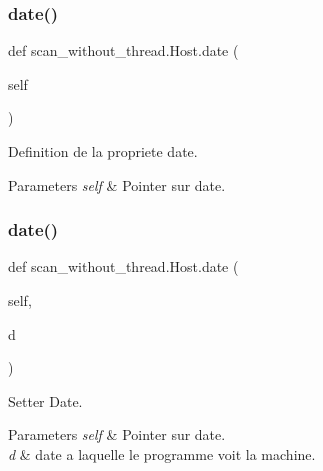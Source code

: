 \subsubsection{\texorpdfstring{date()}{date()}\hspace{0.1cm}{\footnotesize\ttfamily [1/2]}}
{\footnotesize\ttfamily def scan\+\_\+without\+\_\+thread.\+Host.\+date (\begin{DoxyParamCaption}\item[{}]{self }\end{DoxyParamCaption})}



Definition de la propriete date. 


\begin{DoxyParams}{Parameters}
{\em self} & Pointer sur date. \\
\hline
\end{DoxyParams}
\hypertarget{classscan__without__thread_1_1Host_a82dddd1ba57f1f790b16c1618753f59e}{}\label{classscan__without__thread_1_1Host_a82dddd1ba57f1f790b16c1618753f59e} 
\subsubsection{\texorpdfstring{date()}{date()}\hspace{0.1cm}{\footnotesize\ttfamily [2/2]}}
{\footnotesize\ttfamily def scan\+\_\+without\+\_\+thread.\+Host.\+date (\begin{DoxyParamCaption}\item[{}]{self,  }\item[{}]{d }\end{DoxyParamCaption})}



Setter Date. 


\begin{DoxyParams}{Parameters}
{\em self} & Pointer sur date. \\
\hline
{\em d} & date a laquelle le programme voit la machine. \\
\hline
\end{DoxyParams}
\hypertarget{classscan__without__thread_1_1Host_af0c9f53c893137c3cc3e8cb2a4bf318c}{}\label{classscan__without__thread_1_1Host_af0c9f53c893137c3cc3e8cb2a4bf318c} 
